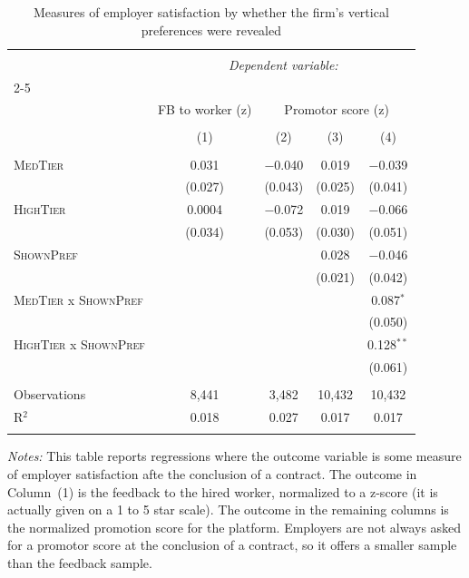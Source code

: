 
\begin{table}[!htbp] \centering 
  \caption{Measures of employer satisfaction by whether the firm's vertical preferences were revealed} 
  \label{tab:compensating_differential_argument} 
\small 
\begin{tabular}{@{\extracolsep{5pt}}lcccc} 
\\[-1.8ex]\hline 
\hline \\[-1.8ex] 
 & \multicolumn{4}{c}{\textit{Dependent variable:}} \\ 
\cline{2-5} 
\\[-1.8ex] & FB to worker (z) & \multicolumn{3}{c}{Promotor score (z)} \\ 
\\[-1.8ex] & (1) & (2) & (3) & (4)\\ 
\hline \\[-1.8ex] 
 \textsc{MedTier} & 0.031 & $-$0.040 & 0.019 & $-$0.039 \\ 
  & (0.027) & (0.043) & (0.025) & (0.041) \\ 
  \textsc{HighTier} & 0.0004 & $-$0.072 & 0.019 & $-$0.066 \\ 
  & (0.034) & (0.053) & (0.030) & (0.051) \\ 
  \textsc{ShownPref} &  &  & 0.028 & $-$0.046 \\ 
  &  &  & (0.021) & (0.042) \\ 
  \textsc{MedTier} x \textsc{ShownPref} &  &  &  & 0.087$^{*}$ \\ 
  &  &  &  & (0.050) \\ 
  \textsc{HighTier} x \textsc{ShownPref} &  &  &  & 0.128$^{**}$ \\ 
  &  &  &  & (0.061) \\ 
 \hline \\[-1.8ex] 
Observations & 8,441 & 3,482 & 10,432 & 10,432 \\ 
R$^{2}$ & 0.018 & 0.027 & 0.017 & 0.017 \\ 
\hline 
\hline \\[-1.8ex] 
\end{tabular}
\begin{minipage}{1\textwidth} 
 \emph{Notes:} This table reports regressions where the outcome variable is some measure of employer satisfaction afte the conclusion of a contract.
The outcome in Column~(1) is the feedback to the hired worker, normalized to a z-score (it is actually given on a 1 to 5 star scale). 
The outcome in the remaining columns is the normalized promotion score for the platform.
Employers are not always asked for a promotor score at the conclusion of a contract, so it offers a smaller sample than the feedback sample.
 \starlanguage
 \end{minipage}
\end{table}

